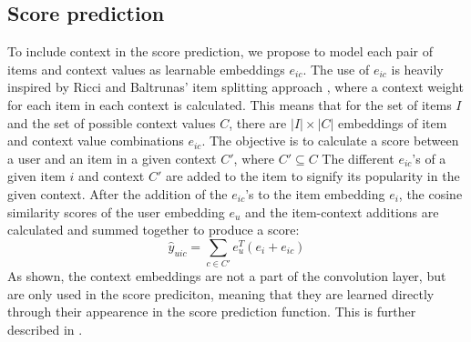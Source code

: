 \subsection{Score prediction}\label{subsec:csgcn_is_score_prediction}
To include context in the score prediction, we propose to model each pair of items and context values as learnable embeddings $e_{ic}$.
The use of $e_{ic}$ is heavily inspired by Ricci and Baltrunas' item splitting approach \cite{baltrunasitemsplitting}, where a context weight for each item in each context is calculated.
This means that for the set of items $I$ and the set of possible context values $C$, there are $|I| \times |C|$ embeddings of item and context value combinations $e_{ic}$.
The objective is to calculate a score between a user and an item in a given context $C'$, where $C' \subseteq C$
The different $e_{ic}$'s of a given item $i$ and context $C'$ are added to the item to signify its popularity in the given context.
After the addition of the $e_{ic}$'s to the item embedding $e_i$, the cosine similarity scores of the user embedding $e_u$ and the item-context additions are calculated and summed together to produce a score: 
$$\hat{y}_{uic} = \sum_{c \in C'} e_u^T(e_i+e_{ic})$$
As shown, the context embeddings are not a part of the convolution layer, but are only used in the score prediciton, meaning that they are learned directly through their appearence in the score prediction function.
This is further described in .

